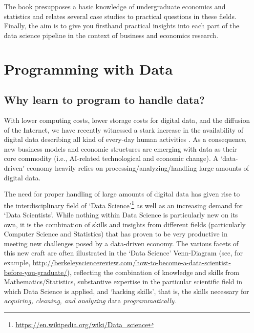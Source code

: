 \documentclass[
  12pt,
]{style/krantz}
\renewcommand{\href}[2]{#2\footnote{\url{#1}}}
\begin{document}
The book presupposes a basic knowledge of undergraduate economics and statistics and relates several case studies to practical questions in these fields. Finally, the aim is to give you firsthand practical insights into each part of the data science pipeline in the context of business and economics research.

\hypertarget{programming-with-data}{%
\chapter{Programming with Data}\label{programming-with-data}}

\hypertarget{why-learn-to-program-to-handle-data}{%
\section{Why learn to program to handle data?}\label{why-learn-to-program-to-handle-data}}

With lower computing costs, lower storage costs for digital data, and the diffusion of the Internet, we have recently witnessed a stark increase in the availability of digital data describing all kind of every-day human activities \citep{einav_levin2014, matter_stutzer2015}. As a consequence, new business models and economic structures are emerging with data as their core commodity (i.e., AI-related technological and economic change). A `data-driven' economy heavily relies on processing/analyzing/handling large amounts of digital data.

The need for proper handling of large amounts of digital data has given rise to the interdisciplinary field of \href{https://en.wikipedia.org/wiki/Data_science}{`Data Science'} as well as an increasing demand for `Data Scientists'. While nothing within Data Science is particularly new on its own, it is the combination of skills and insights from different fields (particularly Computer Science and Statistics) that has proven to be very productive in meeting new challenges posed by a data-driven economy. The various facets of this new craft are often illustrated in the `Data Science' Venn-Diagram (see, for example, \url{http://berkeleysciencereview.com/how-to-become-a-data-scientist-before-you-graduate/}), reflecting the combination of knowledge and skills from Mathematics/Statistics, substantive expertise in the particular scientific field in which Data Science is applied, and `hacking skills', that is, the skills necessary for \emph{acquiring, cleaning, and analyzing} data \emph{programmatically}.
\end{document}
